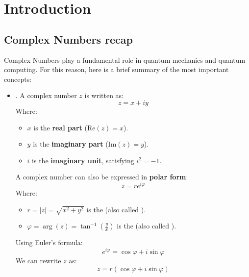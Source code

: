 \section{Introduction}

\subsection{Complex Numbers recap}

Complex Numbers play a fundamental role in quantum mechanics and quantum computing. For this reason, here is a brief summary of the most important concepts:
\begin{itemize}
    \item {}. A complex number $z$ is written as:
    \begin{equation*}
        z = x + iy
    \end{equation*}
    Where:
    \begin{itemize}
        \item $x$ is the \textbf{real part} ($\text{Re}(z) = x$).
        \item $y$ is the \textbf{imaginary part} ($\text{Im}(z) = y$).
        \item $i$ is the \textbf{imaginary unit}, satisfying $i^{2} = -1$.
    \end{itemize}
    A complex number can also be expressed in \textbf{polar form}:
    \begin{equation*}
        z = re^{i \varphi}
    \end{equation*}
    Where:
    \begin{itemize}
        \item $r = \left|z\right| = \sqrt{x^{2} + y^{2}}$ is the  (also called ).
        \item $\varphi = \arg(z) = \tan^{-1} \left( \frac{y}{x} \right)$ is the  (also called ).
    \end{itemize}
    Using Euler's formula:
    \begin{equation*}
        e^{i \varphi} = \cos \varphi + i \sin \varphi
    \end{equation*}
    We can rewrite $z$ as:
    \begin{equation*}
        z = r \left(\cos \varphi + i \sin \varphi\right)
    \end{equation*}


\end{itemize}
